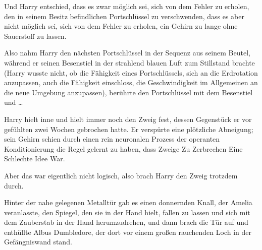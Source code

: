 Und Harry entschied, dass es zwar möglich sei, sich von dem Fehler zu erholen, den in seinem Besitz befindlichen Portschlüssel zu verschwenden, dass es aber nicht möglich sei, sich von dem Fehler zu erholen, ein Gehirn zu lange ohne Sauerstoff zu lassen.

Also nahm Harry den nächsten Portschlüssel in der Sequenz aus seinem Beutel, während er seinen Besenstiel in der strahlend blauen Luft zum Stillstand brachte (Harry wusste nicht, ob die Fähigkeit eines Portschlüssels, sich an die Erdrotation anzupassen, auch die Fähigkeit einschloss, die Geschwindigkeit im Allgemeinen an die neue Umgebung anzupassen), berührte den Portschlüssel mit dem Besenstiel und …

Harry hielt inne und hielt immer noch den Zweig fest, dessen Gegenstück er vor gefühlten zwei Wochen gebrochen hatte. Er verspürte eine plötzliche Abneigung; sein Gehirn schien durch einen rein neuronalen Prozess der operanten Konditionierung die Regel gelernt zu haben, dass Zweige Zu Zerbrechen Eine Schlechte Idee War.

Aber das war eigentlich nicht logisch, also brach Harry den Zweig trotzdem durch.

\later

Hinter der nahe gelegenen Metalltür gab es einen donnernden Knall, der Amelia veranlasste, den Spiegel, den sie in der Hand hielt, fallen zu lassen und sich mit dem Zauberstab in der Hand herumzudrehen, und dann brach die Tür auf und enthüllte Albus Dumbledore, der dort vor einem großen rauchenden Loch in der Gefängniswand stand.

